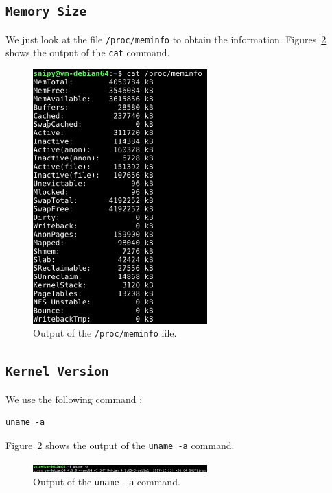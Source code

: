\documentclass[a4paper,11pt]{report}
\begin{document}
\subsection*{\texttt{Memory Size}}
We just look at the file \verb+/proc/meminfo+ to obtain the information.
Figures~\ref{fig:mem} shows the output of the \verb+cat+ command.

\begin{figure}[ht]
  \centering
  \includegraphics[width=0.6\textwidth]{figures/mem}
  \caption{\label{fig:mem} Output of the \texttt{/proc/meminfo} file.}
\end{figure}

\subsection*{\texttt{Kernel Version}}

We use the following command :

\begin{verbatim}
uname -a
\end{verbatim}

Figure~\ref{fig:mem} shows the output of the \verb+uname -a+ command.

\begin{figure}[ht]
  \centering
  \includegraphics[width=0.6\textwidth]{figures/kernel}
  \caption{\label{fig:mem} Output of the \texttt{uname -a} command.}
\end{figure}
\end{document}
